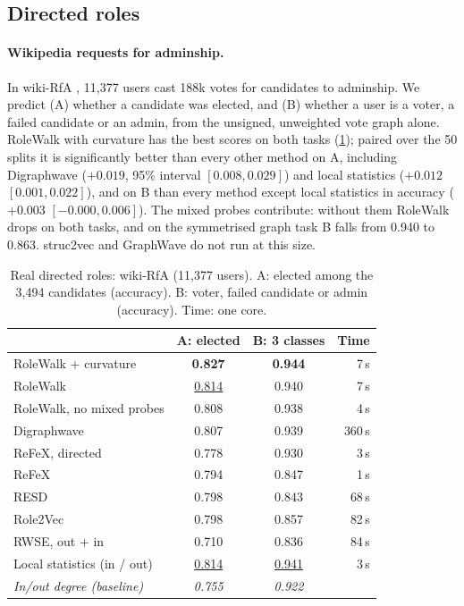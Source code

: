 \documentclass[10pt]{article}
\theoremstyle{definition}
\newcommand{\best}[1]{\textbf{#1}}
\newcommand{\second}[1]{\underline{#1}}
\begin{document}
\subsection{Directed roles}

\paragraph{Wikipedia requests for adminship.}
In wiki-RfA \citep{west2014}, 11,377 users cast 188k votes for candidates to adminship.
We predict (A) whether a candidate was elected, and (B) whether a user is a voter, a failed candidate or an admin, from the unsigned, unweighted vote graph alone.
RoleWalk with curvature has the best scores on both tasks (\cref{tab:rfa}); paired over the 50 splits it is significantly better than every other method on A, including Digraphwave ($+0.019$, 95\% interval $[0.008, 0.029]$) and local statistics ($+0.012$ $[0.001, 0.022]$), and on B than every method except local statistics in accuracy ($+0.003$ $[-0.000, 0.006]$).
The mixed probes contribute: without them RoleWalk drops on both tasks, and on the symmetrised graph task B falls from 0.940 to 0.863.
struc2vec and GraphWave do not run at this size.

\begin{table}[t]
\centering
\caption{Real directed roles: wiki-RfA (11,377 users). A: elected among the 3,494 candidates (accuracy). B: voter, failed candidate or admin (accuracy). Time: one core.}
\label{tab:rfa}
\small
\begin{tabular}{lccr}
\toprule
& A: elected & B: 3 classes & Time \\
\midrule
RoleWalk + curvature & \best{0.827} & \best{0.944} & 7\,s \\
RoleWalk & \second{0.814} & 0.940 & 7\,s \\
RoleWalk, no mixed probes & 0.808 & 0.938 & 4\,s \\
Digraphwave & 0.807 & 0.939 & 360\,s \\
ReFeX, directed & 0.778 & 0.930 & 3\,s \\
ReFeX & 0.794 & 0.847 & 1\,s \\
RESD & 0.798 & 0.843 & 68\,s \\
Role2Vec & 0.798 & 0.857 & 82\,s \\
RWSE, out + in & 0.710 & 0.836 & 84\,s \\
Local statistics (in / out) & \second{0.814} & \second{0.941} & 3\,s \\
\midrule
\emph{In/out degree (baseline)} & \emph{0.755} & \emph{0.922} & \\
\bottomrule
\end{tabular}
\end{table}
\end{document}
